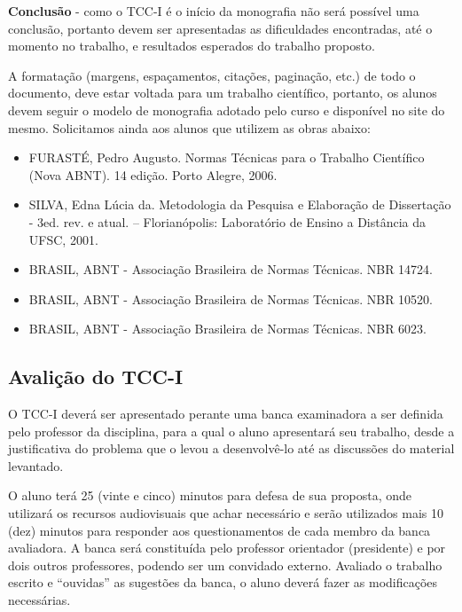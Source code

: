 \textbf{Conclus\~{a}o} - como o TCC-I \'{e} o in\'{i}cio da monografia n\~{a}o ser\'{a} poss\'{i}vel uma conclus\~{a}o, portanto devem ser apresentadas as dificuldades encontradas, at\'{e} o momento no trabalho, e resultados esperados do trabalho proposto.

A formata\c{c}\~{a}o (margens, espa\c{c}amentos, cita\c{c}\~{o}es, pagina\c{c}\~{a}o, etc.) de todo o documento, deve estar voltada para um trabalho cient\'{i}fico, portanto, 
os alunos devem seguir o modelo de monografia adotado pelo curso e dispon\'{i}vel no site do mesmo. 
Solicitamos ainda aos alunos que utilizem as obras abaixo:

	\begin{itemize}	
		\item  FURAST\'{E}, Pedro Augusto. Normas T\'{e}cnicas para o Trabalho Cient\'{i}fico (Nova ABNT). 14 edi\c{c}\~{a}o. Porto Alegre, 2006.

		\item SILVA, Edna L\'{u}cia da. Metodologia da Pesquisa e Elabora\c{c}\~{a}o de Disserta\c{c}\~{a}o - 3ed. rev. e atual. – Florian\'{o}polis: Laborat\'{o}rio de Ensino a Dist\^{a}ncia da 			UFSC, 2001.

		\item BRASIL, ABNT - Associa\c{c}\~{a}o Brasileira de Normas T\'{e}cnicas. NBR 14724.

		\item BRASIL, ABNT - Associa\c{c}\~{a}o Brasileira de Normas T\'{e}cnicas. NBR 10520.

		\item BRASIL, ABNT - Associa\c{c}\~{a}o Brasileira de Normas T\'{e}cnicas. NBR 6023.
	\end{itemize}
	

\subsection{Avali\c{c}\~{a}o do TCC-I}

O TCC-I dever\'{a} ser apresentado perante uma banca examinadora a ser definida pelo professor da disciplina, para a qual o aluno apresentar\'{a} seu trabalho, desde a justificativa do problema que o levou a desenvolv\^{e}-lo at\'{e} as discuss\~{o}es do material levantado.

O aluno ter\'{a} 25 (vinte e cinco) minutos para defesa de sua proposta, onde utilizar\'{a} os recursos audiovisuais que achar necess\'{a}rio e ser\~{a}o utilizados mais 10 (dez) minutos para responder aos questionamentos de cada membro da banca avaliadora. A banca ser\'{a} constitu\'{i}da pelo professor orientador (presidente) e por dois outros professores, podendo ser um convidado externo. Avaliado o trabalho escrito e ``ouvidas'' as sugest\~{o}es da banca, o aluno dever\'{a} fazer as modifica\c{c}\~{o}es necess\'{a}rias.


